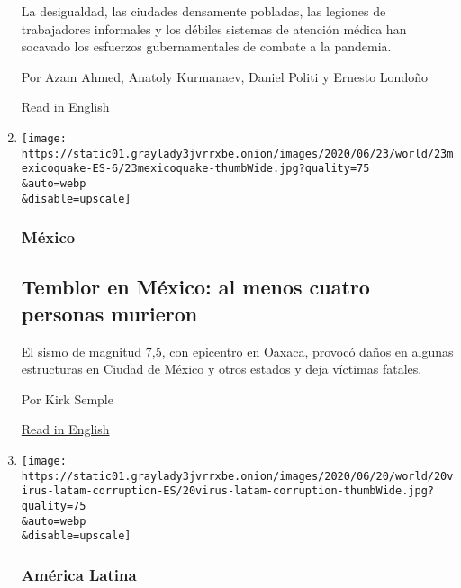 \begin{enumerate}
  La desigualdad, las ciudades densamente pobladas, las legiones de
  trabajadores informales y los débiles sistemas de atención médica han
  socavado los esfuerzos gubernamentales de combate a la pandemia.

  Por Azam Ahmed, Anatoly Kurmanaev, Daniel Politi y Ernesto Londoño

  \href{https://www.nytimes3xbfgragh.onion/2020/06/23/world/americas/coronavirus-brazil-mexico-peru-chile-uruguay.html}{Read
  in English}
\item
  \href{/es/2020/06/23/espanol/america-latina/temblor-mexico-sismo.html}{}

  \texttt{[image: https://static01.graylady3jvrrxbe.onion/images/2020/06/23/world/23mexicoquake-ES-6/23mexicoquake-thumbWide.jpg?quality=75\\\&auto=webp\\\&disable=upscale]}

  \hypertarget{muxe9xico}{%
  \subsubsection{México}\label{muxe9xico}}

  \hypertarget{temblor-en-muxe9xico-al-menos-cuatro-personas-murieron}{%
  \subsection{Temblor en México: al menos cuatro personas
  murieron}\label{temblor-en-muxe9xico-al-menos-cuatro-personas-murieron}}

  El sismo de magnitud 7,5, con epicentro en Oaxaca, provocó daños en
  algunas estructuras en Ciudad de México y otros estados y deja
  víctimas fatales.

  Por Kirk Semple

  \href{https://www.nytimes3xbfgragh.onion/2020/06/23/world/mexico-earthquake.html}{Read
  in English}
\item
  \href{/es/2020/06/20/espanol/america-latina/corrupcion-coronavirus-latinoamerica.html}{}

  \texttt{[image: https://static01.graylady3jvrrxbe.onion/images/2020/06/20/world/20virus-latam-corruption-ES/20virus-latam-corruption-thumbWide.jpg?quality=75\\\&auto=webp\\\&disable=upscale]}

  \hypertarget{amuxe9rica-latina-3}{%
  \subsubsection{América Latina}\label{amuxe9rica-latina-3}}


\end{enumerate}
